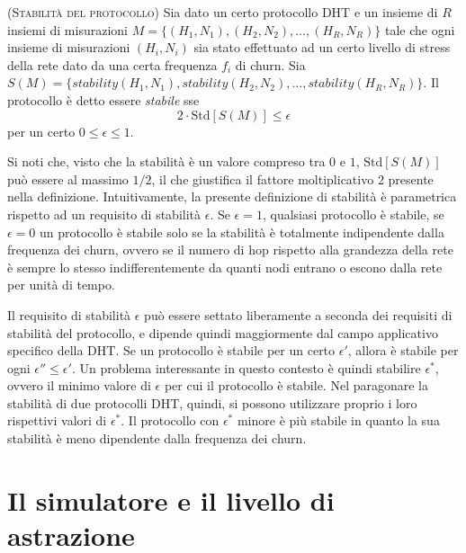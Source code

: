 \documentclass[prodmode,acmtap]{acmlarge}
\begin{document}
\begin{definition}{(\textsc{Stabilità del protocollo})}
Sia dato un certo protocollo DHT e un insieme di $R$ insiemi di misurazioni $M=\{ (H_1,N_1), (H_2,N_2), \dots, (H_R,N_R) \}$ tale che ogni insieme di misurazioni $(H_i,N_i)$ sia stato effettuato ad un certo livello di stress della rete dato da una certa frequenza $f_i$ di churn. Sia $S(M) = \{ stability(H_1,N_1), stability(H_2,N_2), \dots, stability(H_R,N_R) \}$. Il protocollo è detto essere \emph{stabile} sse
$$ 2 \cdot \mathrm{Std}[S(M)] \leq \epsilon $$
per un certo $0 \le \epsilon \le 1$.
\end{definition}

Si noti che, visto che la stabilità è un valore compreso tra $0$ e $1$, $\mathrm{Std}[S(M)]$ può essere al massimo $1/2$, il che giustifica il fattore moltiplicativo $2$ presente nella definizione. Intuitivamente, la presente definizione di stabilità è parametrica rispetto ad un requisito di stabilità $\epsilon$. Se $\epsilon=1$, qualsiasi protocollo è stabile, se $\epsilon=0$ un protocollo è stabile solo se la stabilità è totalmente indipendente dalla frequenza dei churn, ovvero se il numero di hop rispetto alla grandezza della rete è sempre lo stesso indifferentemente da quanti nodi entrano o escono dalla rete per unità di tempo.

Il requisito di stabilità $\epsilon$ può essere settato liberamente a seconda dei requisiti di stabilità del protocollo, e dipende quindi maggiormente dal campo applicativo specifico della DHT. Se un protocollo è stabile per un certo $\epsilon'$, allora è stabile per ogni $\epsilon'' \le \epsilon'$. Un problema interessante in questo contesto è quindi stabilire $\epsilon^*$, ovvero il minimo valore di $\epsilon$ per cui il protocollo è stabile. Nel paragonare la stabilità di due protocolli DHT, quindi, si possono utilizzare proprio i loro rispettivi valori di $\epsilon^*$. Il protocollo con $\epsilon^*$ minore è più stabile in quanto la sua stabilità è meno dipendente dalla frequenza dei churn.












\section{Il simulatore e il livello di astrazione} \label{simulatore}
\end{document}
